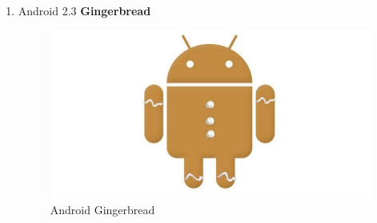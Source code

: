\begin{enumerate}
\item Android 2.3 \textbf{Gingerbread}\\
\begin{figure}[!htbp]
    \centering
    \includegraphics[scale = 0.3]{pictures/android-gingerbread.jpg}
    \caption{Android Gingerbread}
    \label{}
\end{figure}


\end{enumerate}
